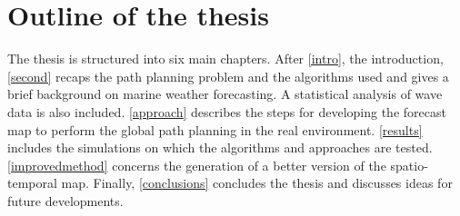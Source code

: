 


\section{Outline of the thesis}
The thesis is structured into six main chapters. After \autoref{intro}, the introduction, \autoref{second} recaps the path planning problem and the algorithms used and gives a brief background on marine weather forecasting. A statistical analysis of wave data is also included. \autoref{approach} describes the steps for developing the forecast map to perform the global path planning in the real environment.
\autoref{results} includes the simulations on which the algorithms and approaches are tested. \autoref{improvedmethod} concerns the generation of a better version of the spatio-temporal map.
Finally, \autoref{conclusions} concludes the thesis and discusses ideas for future developments.  %
